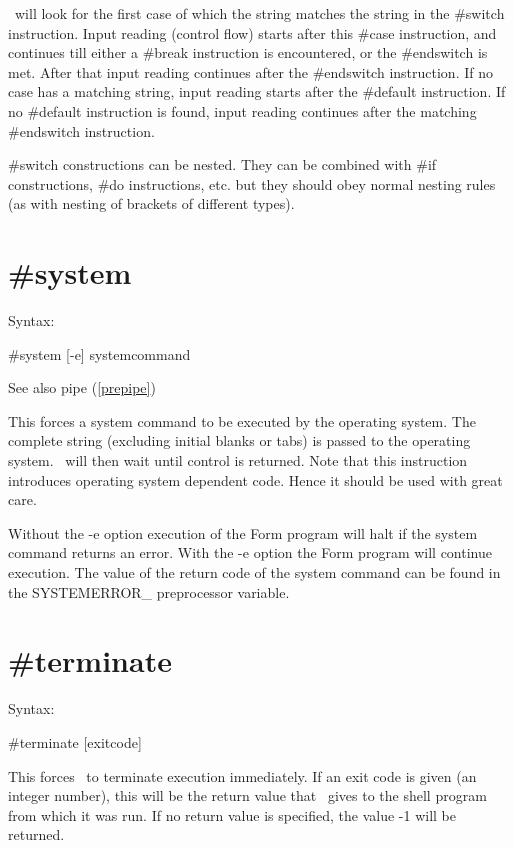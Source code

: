 \FORM\ will look for the first case of which the string matches the string 
in the \#switch instruction. Input reading (control flow) starts after this 
\#case instruction, and continues till either a \#break instruction is 
encountered, or the \#endswitch is met. After that input reading continues 
after the \#endswitch instruction. If no case has a matching string, input 
reading starts after the \#default instruction. If no \#default instruction 
is found, input reading continues after the matching \#endswitch 
instruction.

\#switch constructions can be nested. They can be combined 
with \#if constructions, \#do instructions, etc. 
but they should obey normal nesting rules (as with nesting of 
brackets of different types).

 
\section{\#system}
\label{presystem}

\noindent Syntax:

\#system [-e] systemcommand
 
\noindent See also pipe (\ref{prepipe})

\noindent This forces a system command to be executed by 
the operating system. The complete string (excluding initial blanks or 
tabs) is passed to the operating system. \FORM\ will then wait until control 
is returned. Note that this instruction introduces operating system 
dependent code. Hence it should be used with great care.

\noindent Without the -e option execution of the Form program will halt if 
the system command returns an error. With the -e option the Form program 
will continue execution. The value of the return code of the system command 
can be found in the SYSTEMERROR\_ preprocessor variable.

 
\section{\#terminate}
\label{preterminate}

\noindent Syntax:

\#terminate [exitcode]
 
\noindent This forces \FORM\ to terminate execution 
immediately. If an exit code is given (an integer number), this will be the 
return value that \FORM\ gives to the shell program from which it was run. If 
no return value is specified, the value -1 will be returned.

